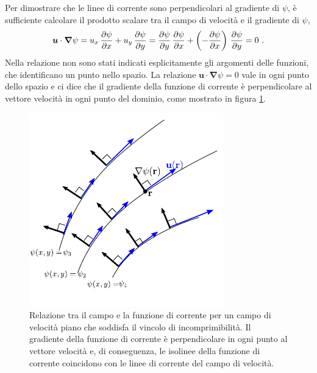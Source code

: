 \noindent
Per dimostrare che le linee di corrente sono perpendicolari al gradiente di $\psi$, è sufficiente calcolare il prodotto scalare tra il campo di velocità e il gradiente di $\psi$,
\begin{equation}
 \bm{u} \cdot \bm{\nabla} \psi = u_x \, \dfrac{\partial{\psi}}{\partial{x}} + u_y \, \dfrac{\partial{\psi}}{\partial{y}}   
                               = \dfrac{\partial{\psi}}{\partial{y}} \, \dfrac{\partial{\psi}}{\partial{x}} + \left(-\dfrac{\partial{\psi}}{\partial{x}} \right) \, \dfrac{\partial{\psi}}{\partial{y}} = 0 \ .
\end{equation}
Nella relazione non sono stati indicati esplicitamente gli argomenti delle funzioni, che identificano un punto nello spazio. La relazione $\bm{u} \cdot \bm{\nabla} \psi = 0$ vale in ogni punto dello spazio e ci dice che il gradiente della funzione di corrente è perpendicolare al vettore velocità in ogni punto del dominio, come mostrato in figura \ref{fig:streaml}.

\begin{figure}[h!]
\centering
 \includegraphics[width=0.75\textwidth]{./psi_streamlines}
 \caption{Relazione tra il campo e la funzione di corrente per un campo di velocità piano che soddisfa il vincolo di incomprimibilità. Il gradiente della funzione di corrente è perpendicolare in ogni punto al vettore velocità e, di conseguenza, le isolinee della funzione di corrente coincidono con le linee di corrente del campo di velocità.}\label{fig:streaml}
\end{figure}
